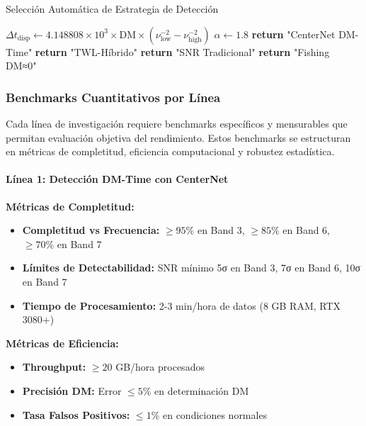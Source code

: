 \begin{algorithm}[H]
\caption{Selección Automática de Estrategia de Detección}
\begin{algorithmic}[1]
    \State $\Delta t_{\text{disp}} \leftarrow 4.148808 \times 10^3 \times \text{DM} \times (\nu_{\text{low}}^{-2} - \nu_{\text{high}}^{-2})$
    \State $\alpha \leftarrow 1.8$ 
        \State \textbf{return} "CenterNet DM-Time"
        \State \textbf{return} "TWL-Híbrido"
        \State \textbf{return} "SNR Tradicional"
    \Else
        \State \textbf{return} "Fishing DM≈0"
    \EndIf
\EndFunction
\end{algorithmic}
\end{algorithm}

\subsubsection{Benchmarks Cuantitativos por Línea}

Cada línea de investigación requiere benchmarks específicos y mensurables que permitan evaluación objetiva del rendimiento. Estos benchmarks se estructuran en métricas de completitud, eficiencia computacional y robustez estadística.

\paragraph{Línea 1: Detección DM-Time con CenterNet}

\textbf{Métricas de Completitud:}
\begin{itemize}
\item \textbf{Completitud vs Frecuencia:} $\geq 95\%$ en Band 3, $\geq 85\%$ en Band 6, $\geq 70\%$ en Band 7
\item \textbf{Límites de Detectabilidad:} SNR mínimo 5σ en Band 3, 7σ en Band 6, 10σ en Band 7
\item \textbf{Tiempo de Procesamiento:} 2-3 min/hora de datos (8 GB RAM, RTX 3080+)
\end{itemize}

\textbf{Métricas de Eficiencia:}
\begin{itemize}
\item \textbf{Throughput:} $\geq 20$ GB/hora procesados
\item \textbf{Precisión DM:} Error $\leq 5\%$ en determinación DM
\item \textbf{Tasa Falsos Positivos:} $\leq 1\%$ en condiciones normales
\end{itemize}

